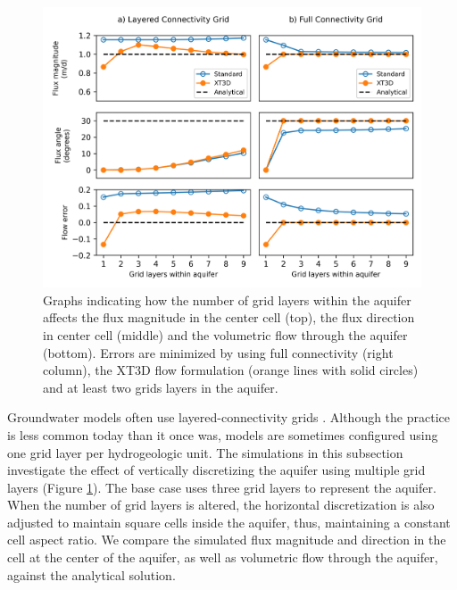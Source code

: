 \documentclass{article}
\begin{document}
\begin{figure}
	\begin{center}
	\includegraphics[scale=0.9]{../figures/fig3_paper.png}
	\caption{Graphs indicating how the number of grid layers within the aquifer affects the flux magnitude in the center cell (top), the flux direction in center cell (middle) and the volumetric flow through the aquifer (bottom). Errors are minimized by using full connectivity (right column), the XT3D flow formulation (orange lines with solid circles) and at least two grids layers in the aquifer.}
	\label{fig:fig3}
	\end{center}
\end{figure}

Groundwater models often use layered-connectivity grids \citep{Reilly2004}. Although the practice is less common today than it once was, models are sometimes configured using one grid layer per hydrogeologic unit. The simulations in this subsection investigate the effect of vertically discretizing the aquifer using multiple grid layers (Figure \ref{fig:fig3}). The base case uses three grid layers to represent the aquifer. When the number of grid layers is altered, the horizontal discretization is also adjusted to maintain square cells inside the aquifer, thus, maintaining a constant cell aspect ratio. We compare the simulated flux magnitude and direction in the cell at the center of the aquifer, as well as volumetric flow through the aquifer, against the analytical solution.
\end{document}
